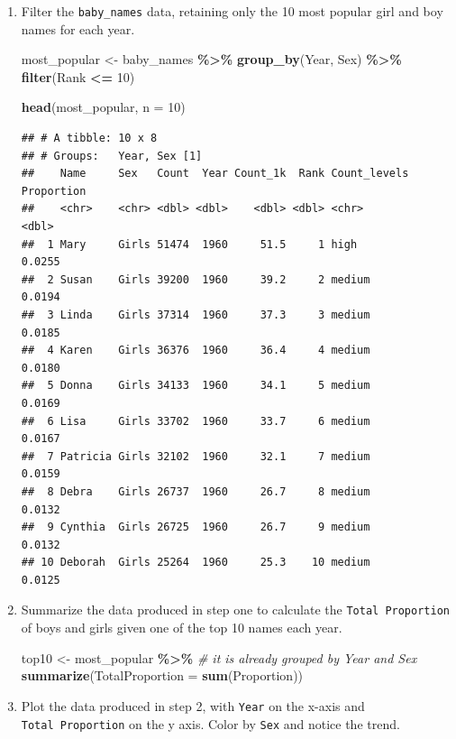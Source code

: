\documentclass[
]{book}
\newenvironment{Shaded}{\begin{snugshade}}{\end{snugshade}}
\newcommand{\CommentTok}[1]{\textcolor[rgb]{0.56,0.35,0.01}{\textit{#1}}}
\newcommand{\DataTypeTok}[1]{\textcolor[rgb]{0.13,0.29,0.53}{#1}}
\newcommand{\DecValTok}[1]{\textcolor[rgb]{0.00,0.00,0.81}{#1}}
\newcommand{\KeywordTok}[1]{\textcolor[rgb]{0.13,0.29,0.53}{\textbf{#1}}}
\newcommand{\NormalTok}[1]{#1}
\newcommand{\OperatorTok}[1]{\textcolor[rgb]{0.81,0.36,0.00}{\textbf{#1}}}
\newcommand{\StringTok}[1]{\textcolor[rgb]{0.31,0.60,0.02}{#1}}
\begin{document}
\begin{alert}

\begin{enumerate}
\def\labelenumi{\arabic{enumi}.}
\item
  Filter the \texttt{baby\_names} data, retaining only the 10 most popular girl and boy names for each year.

\begin{Shaded}
\begin{Highlighting}[]
\NormalTok{most\_popular \textless{}{-}}\StringTok{ }
\StringTok{  }\NormalTok{baby\_names }\OperatorTok{\%\textgreater{}\%}\StringTok{ }
\StringTok{  }\KeywordTok{group\_by}\NormalTok{(Year, Sex) }\OperatorTok{\%\textgreater{}\%}
\StringTok{  }\KeywordTok{filter}\NormalTok{(Rank }\OperatorTok{\textless{}=}\StringTok{ }\DecValTok{10}\NormalTok{)}

\KeywordTok{head}\NormalTok{(most\_popular, }\DataTypeTok{n =} \DecValTok{10}\NormalTok{)}
\end{Highlighting}
\end{Shaded}

\begin{verbatim}
## # A tibble: 10 x 8
## # Groups:   Year, Sex [1]
##    Name     Sex   Count  Year Count_1k  Rank Count_levels Proportion
##    <chr>    <chr> <dbl> <dbl>    <dbl> <dbl> <chr>             <dbl>
##  1 Mary     Girls 51474  1960     51.5     1 high             0.0255
##  2 Susan    Girls 39200  1960     39.2     2 medium           0.0194
##  3 Linda    Girls 37314  1960     37.3     3 medium           0.0185
##  4 Karen    Girls 36376  1960     36.4     4 medium           0.0180
##  5 Donna    Girls 34133  1960     34.1     5 medium           0.0169
##  6 Lisa     Girls 33702  1960     33.7     6 medium           0.0167
##  7 Patricia Girls 32102  1960     32.1     7 medium           0.0159
##  8 Debra    Girls 26737  1960     26.7     8 medium           0.0132
##  9 Cynthia  Girls 26725  1960     26.7     9 medium           0.0132
## 10 Deborah  Girls 25264  1960     25.3    10 medium           0.0125
\end{verbatim}
\item
  Summarize the data produced in step one to calculate the \texttt{Total\ Proportion} of boys and girls given one of the top 10 names each year.

\begin{Shaded}
\begin{Highlighting}[]
\NormalTok{top10 \textless{}{-}}\StringTok{ }
\StringTok{  }\NormalTok{most\_popular }\OperatorTok{\%\textgreater{}\%}\StringTok{ }\CommentTok{\# it is already grouped by Year and Sex}
\StringTok{  }\KeywordTok{summarize}\NormalTok{(}\DataTypeTok{TotalProportion =} \KeywordTok{sum}\NormalTok{(Proportion))}
\end{Highlighting}
\end{Shaded}
\item
  Plot the data produced in step 2, with \texttt{Year} on the x-axis and \texttt{Total\ Proportion} on the y axis. Color by \texttt{Sex} and notice the trend.


\end{enumerate}
\end{alert}
\end{document}
